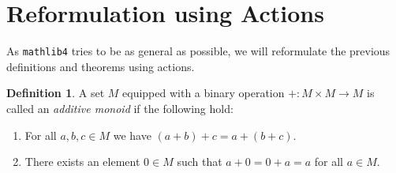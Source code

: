 \documentclass[11pt]{article}
\newtheorem{theorem}{Theorem}
\theoremstyle{definition}              %
\newtheorem{definition}{Definition}[section]
\theoremstyle{definition}              %
\theoremstyle{definition}              %
\begin{document}
\begin{comment}
\pagebreak
\section{Existence of a minimal invariant subsets}
An immediate consequence of theorem \ref{thm1} is the following:

\begin{theorem}\label{thm2}
    Let $X$ be a non-empty and compact topological space and $T: X \to X$ a homeomorphism. Then there exists a closed and non-empty $Y \subseteq X$ which is $T-$invariant and such that the action induced by $T|_Y:Y \to Y$ in the sense of equation \ref{eq1} is minimal.
\end{theorem}

We give a proof from Ceglie's lecture notes (see \citep[Thm.~1.14,pp.~13 ff.]{ceglie}).

\begin{proof}
    We begin by defining the family:
    \begin{equation}
        \mathcal{E}:=\{Y \subseteq X | Y \neq \varnothing, Y \text{ is closed and } TY=Y\}. 
    \end{equation}
    Then $X \in \mathcal{E}$ so $\mathcal{E} \neq \varnothing$. Moreover, if $(Y_k)_{k \in I}$ is any chain with respect to $\supseteq$ in $\mathcal{E}$ for some index set $I$, then:
    \begin{equation}
        Y^* := \bigcap_{k \in I} Y_k
    \end{equation}
    yields a lower bound on the chain. As the chain we picked was arbitrary, by \textbf{Zorn's Lemma} (and using the Axiom of Choice) we get that there exists a minimal element $Y$ of $\mathcal{E}$. But then as an immediate consequence of theorem \ref{thm1} $T|_Y:Y \to Y$ is minimal.
\end{proof}
\end{comment}


\pagebreak
\section{Reformulation using Actions}

As \texttt{mathlib4} tries to be as general as possible, we will reformulate the previous definitions and theorems using actions.

\begin{definition}
A set $M$ equipped with a binary operation $+ \colon M \times M \to M$ is called an \emph{additive monoid} if the following hold:
\begin{enumerate}
  \item For all $a,b,c \in M$ we have $(a + b) + c = a + (b + c)$.
  \item There exists an element $0 \in M$ such that $a + 0 = 0 + a = a$ for all $a \in M$.
\end{enumerate}
\end{definition}
\end{document}
